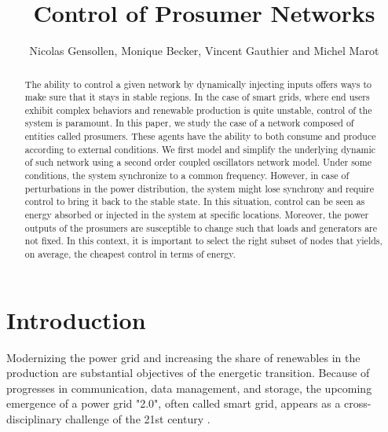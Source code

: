 \documentclass[conference]{IEEEtran}
\begin{document}
\pagestyle{plain}
\title{Control of Prosumer Networks}


\author{Nicolas Gensollen, Monique Becker, Vincent Gauthier and Michel Marot  \\
}


\maketitle


\begin{abstract}
The ability to control a given network by  dynamically injecting inputs offers ways to make sure that it stays in stable regions. In the case of smart grids, where end users exhibit complex behaviors and renewable production is quite unstable, control of the system  is paramount. In this paper, we study the case of a network composed of entities called prosumers. These agents have the ability to both consume and produce according to external conditions. We first model and simplify the underlying dynamic of such network using a second order coupled oscillators network model. Under some conditions, the system synchronize to a common frequency. However, in case of perturbations in the power distribution, the system might lose synchrony and require control to bring it back to the stable state. In this situation, control can be seen as energy  absorbed or injected in the system at specific locations. Moreover, the power outputs of the prosumers are susceptible to change such that loads and generators are not fixed. In this context, it is important to select the right subset of nodes that yields, on average, the cheapest control in terms of energy. 
\end{abstract}


\IEEEpeerreviewmaketitle


\section{Introduction}
\label{sec:introduction}

Modernizing the power grid and increasing the share of renewables in the production are substantial objectives of the energetic transition. Because of progresses in communication, data management, and storage, the upcoming emergence of a power grid "2.0", often called smart grid, appears as a cross-disciplinary challenge of the 21st century \cite{Ramchurn}.
\end{document}
